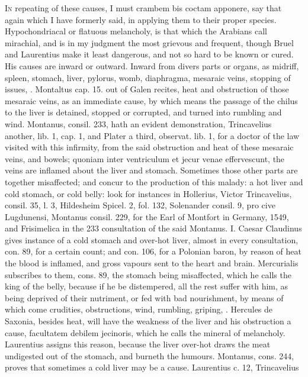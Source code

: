 {\lettrine{I}{n} repeating of these causes, I must crambem bis coctam apponere, say
that again which I have formerly said, in applying them to their proper
species. Hypochondriacal or flatuous melancholy, is that which the
Arabians call mirachial, and is in my judgment the most grievous and
frequent, though Bruel and Laurentius make it least dangerous, and not
so hard to be known or cured. His causes are inward or outward. Inward
from divers parts or organs, as midriff, spleen, stomach, liver,
pylorus, womb, diaphragma, mesaraic veins, stopping of issues, \etc{}.
Montaltus cap. 15. out of Galen recites, heat and obstruction of
those mesaraic veins, as an immediate cause, by which means the passage
of the chilus to the liver is detained, stopped or corrupted, and
turned into rumbling and wind. Montanus, consil. 233, hath an evident
demonstration, Trincavelius another, lib. 1, cap. 1, and Plater a
third, observat. lib. 1, for a doctor of the law visited with this
infirmity, from the said obstruction and heat of these mesaraic veins,
and bowels; quoniam inter ventriculum et jecur venae effervescunt, the
veins are inflamed about the liver and stomach. Sometimes those other
parts are together misaffected; and concur to the production of this
malady: a hot liver and cold stomach, or cold belly: look for instances
in Hollerius, Victor Trincavelius, consil. 35, l. 3, Hildesheim Spicel.
2, fol. 132, Solenander consil. 9, pro cive Lugdunensi, Montanus
consil. 229, for the Earl of Montfort in Germany, 1549, and Frisimelica
in the 233 consultation of the said Montanus. I. Caesar Claudinus gives
instance of a cold stomach and over-hot liver, almost in every
consultation, con. 89, for a certain count; and con. 106, for a
Polonian baron, by reason of heat the blood is inflamed, and gross
vapours sent to the heart and brain. Mercurialis subscribes to them,
cons. 89, the stomach being misaffected, which he calls the king
of the belly, because if he be distempered, all the rest suffer with
him, as being deprived of their nutriment, or fed with bad nourishment,
by means of which come crudities, obstructions, wind, rumbling,
griping, \etc{}. Hercules de Saxonia, besides heat, will have the weakness
of the liver and his obstruction a cause, facultatem debilem jecinoris,
which he calls the mineral of melancholy. Laurentius assigns this
reason, because the liver over-hot draws the meat undigested out of the
stomach, and burneth the humours. Montanus, cons. 244, proves that
sometimes a cold liver may be a cause. Laurentius c. 12, Trincavelius
}

